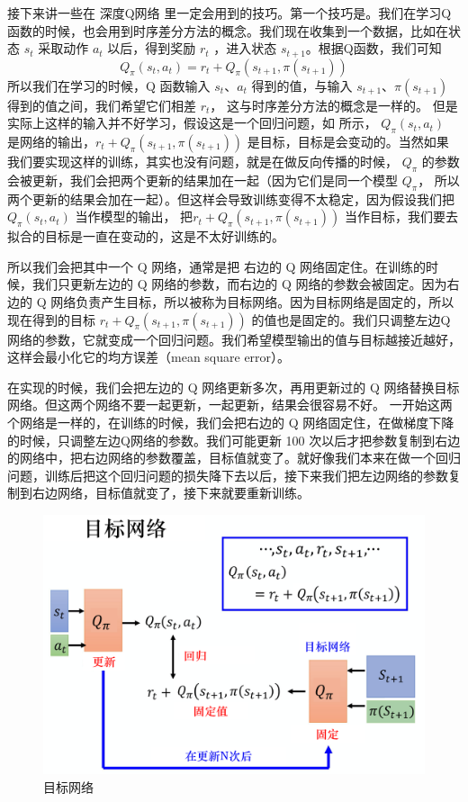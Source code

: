 接下来讲一些在 深度Q网络 里一定会用到的技巧。第一个技巧是。我们在学习Q函数的时候，也会用到时序差分方法的概念。我们现在收集到一个数据，比如在状态 $s_t$ 采取动作 $a_t$ 以后，得到奖励 $r_t$ ，进入状态 $s_{t+1}$。根据Q函数，我们可知
\begin{equation}
    \label{eq:}
    Q_{\pi}\left(s_{t}, a_{t}\right) 
=r_{t}+Q_{\pi}\left(s_{t+1}, \pi\left(s_{t+1}\right)\right)
\end{equation}
所以我们在学习的时候，Q 函数输入 $s_t$、$a_t$ 得到的值，与输入 $s_{t+1}$、$\pi (s_{t+1})$ 得到的值之间，我们希望它们相差 $r_t$， 这与时序差分方法的概念是一样的。
但是实际上这样的输入并不好学习，假设这是一个回归问题，如 所示，
$Q_{\pi}\left(s_{t}, a_{t}\right) $ 是网络的输出，$r_{t}+Q_{\pi}\left(s_{t+1}, \pi\left(s_{t+1}\right)\right)$ 是目标，目标是会变动的。当然如果我们要实现这样的训练，其实也没有问题，就是在做反向传播的时候， $Q_{\pi}$ 的参数会被更新，我们会把两个更新的结果加在一起（因为它们是同一个模型 $Q_{\pi}$， 所以两个更新的结果会加在一起）。但这样会导致训练变得不太稳定，因为假设我们把 $Q_{\pi}\left(s_{t}, a_{t}\right) $ 当作模型的输出， 把$r_{t}+Q_{\pi}\left(s_{t+1}, \pi\left(s_{t+1}\right)\right)$ 当作目标，我们要去拟合的目标是一直在变动的，这是不太好训练的。

所以我们会把其中一个 Q 网络，通常是把 右边的 Q 网络固定住。在训练的时候，我们只更新左边的 Q 网络的参数，而右边的 Q 网络的参数会被固定。因为右边的 Q 网络负责产生目标，所以被称为目标网络。因为目标网络是固定的，所以现在得到的目标 $r_{t}+Q_{\pi}\left(s_{t+1}, \pi\left(s_{t+1}\right)\right)$ 的值也是固定的。我们只调整左边Q网络的参数，它就变成一个回归问题。我们希望模型输出的值与目标越接近越好，这样会最小化它的均方误差（mean square error）。

在实现的时候，我们会把左边的 Q 网络更新多次，再用更新过的 Q 网络替换目标网络。但这两个网络不要一起更新，一起更新，结果会很容易不好。
一开始这两个网络是一样的，在训练的时候，我们会把右边的 Q 网络固定住，在做梯度下降的时候，只调整左边Q网络的参数。我们可能更新 100 次以后才把参数复制到右边的网络中，把右边网络的参数覆盖，目标值就变了。就好像我们本来在做一个回归问题，训练后把这个回归问题的损失降下去以后，接下来我们把左边网络的参数复制到右边网络，目标值就变了，接下来就要重新训练。
\begin{figure}[hbt]
    \centering
    \includegraphics[width=0.5\linewidth]{res/ch6/6.12}
    \caption{目标网络}
    \label{fig:fig6.12}
\end{figure}

